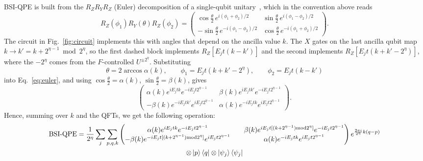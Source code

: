 \documentclass[aps,floatfix,10pt,amssymb,amsfont,amsmath,superscriptaddress,float,nofootinbib,longbibliography,nobalancelastpage,twocolumn]{revtex4-2}
\begin{document}
\begin{widetext}
BSI-QPE is built from the $R_ZR_YR_Z$ (Euler) decomposition of a single-qubit unitary~\cite{Nielsen_Chuang_2010}, which in the convention above reads
\begin{equation}
\label{eq:euler}
R_Z(\phi_1)R_Y(\theta)R_Z(\phi_2) = \begin{pmatrix}
\cos\frac{\theta}{2}\,e^{i(\phi_1+\phi_2)/2} & \sin\frac{\theta}{2}\,e^{i(\phi_1-\phi_2)/2}\\
-\sin\frac{\theta}{2}\,e^{-i(\phi_1-\phi_2)/2} & \cos\frac{\theta}{2}\,e^{-i(\phi_1+\phi_2)/2}
\end{pmatrix}.
\end{equation}
The circuit in Fig.~\ref{fig:circuit} implements this with angles that depend on the ancilla value $k$. The $X$ gates on the last ancilla qubit map $k\to k' = k+2^{\eta-1} \bmod 2^{\eta}$, so the first dashed block implements $R_Z[E_jt(k-k')]$ and the second implements $R_Z[E_jt(k+k'-2^{\eta})]$, where the $-2^{\eta}$ comes from the $F$-controlled $U^{\pm 2^{\eta}}$. Substituting
\begin{equation}
\label{eq:angles}
\theta = 2\arccos\alpha(k),\qquad \phi_1 = E_jt(k+k'-2^{\eta}),\qquad \phi_2 = E_jt(k-k')
\end{equation}
into Eq.~\eqref{eq:euler}, and using $\cos\frac{\theta}{2}=\alpha(k)$, $\sin\frac{\theta}{2}=\beta(k)$, gives
\begin{equation}
\begin{pmatrix}
\alpha(k)e^{iE_jtk}e^{-iE_jt2^{\eta-1}} & \beta(k)e^{iE_jt k'}e^{-iE_jt2^{\eta-1}}\\
-\beta(k)e^{-iE_jt k'}e^{iE_jt2^{\eta-1}} & \alpha(k)e^{-iE_jtk}e^{iE_jt2^{\eta-1}}
\end{pmatrix}.
\end{equation}
Hence, summing over $k$ and the QFTs, we get the following operation:
\begin{multline}
        \text{BSI-QPE} = \frac{1}{2^{\eta}}\sum_j\sum_{p,q,k} \begin{pmatrix}
        \alpha(k)e^{iE_jtk}e^{-iE_jt2^{\eta-1}} && \beta(k)e^{iE_jt[(k+2^{\eta-1})\text{mod} 2^{\eta}]}e^{-iE_jt2^{\eta-1}}\\
        -\beta (k)e^{-iE_jt[(k+2^{\eta-1})\text{mod} 2^{\eta}]}e^{iE_jt2^{\eta-1}} && \alpha(k)e^{-iE_jtk}e^{iE_jt2^{\eta-1}}
    \end{pmatrix}e^{\frac{2\pi i}{2^{\eta}}k(q-p)} \\\otimes\ket{p}\bra{q}\otimes\ket{\psi_j}\bra{\psi_j}
\end{multline}

\end{widetext}
\end{document}

